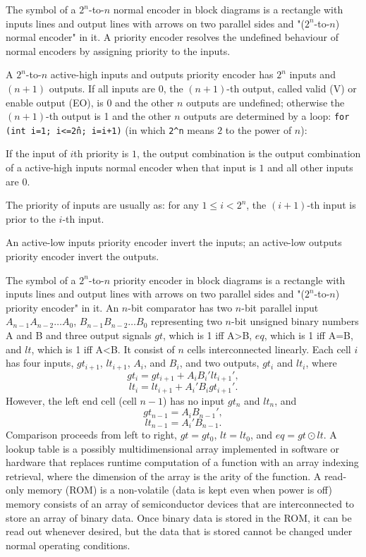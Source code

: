 \documentclass[a4paper,12pt]{report}
\begin{document}
The symbol of a $2^n$-to-$n$ normal encoder in block diagrams is a rectangle with inputs lines and output lines with arrows on two parallel sides and "($2^n$-to-$n$) normal encoder" in it.
A priority encoder resolves the undefined behaviour of normal encoders by assigning priority to the inputs.

A $2^n$-to-$n$ active-high inputs and outputs priority encoder has $2^n$ inputs and $(n+1)$ outputs. If all inputs are 0, the $(n+1)$-th output, called valid (V) or enable output (EO), is 0 and the other $n$ outputs are undefined; otherwise the $(n+1)$-th output is 1 and the other $n$ outputs are determined by a loop: \texttt{for (int i=1; i<=2\^n; i=i+1)} (in which \verb|2^n| means $2$ to the power of $n$):
\bit
\item If the input of $i$th priority is $1$, the output combination is the output combination of a active-high inputs normal encoder when that input is $1$ and all other inputs are $0$.
\eit

The priority of inputs are usually as: for any $1\leq i<2^n$, the $(i+1)$-th input is prior to the $i$-th input.

An active-low inputs priority encoder invert the inputs; an active-low outputs priority encoder invert the outputs.

The symbol of a $2^n$-to-$n$ priority encoder in block diagrams is a rectangle with inputs lines and output lines with arrows on two parallel sides and "($2^n$-to-$n$) priority encoder" in it.
An $n$-bit comparator has two $n$-bit parallel input $A_{n-1}A_{n-2}\ldots A_0$, $B_{n-1}B_{n-2}\ldots B_0$ representing two $n$-bit unsigned binary numbers A and B and three output signals $gt$, which is 1 iff A>B, $eq$, which is 1 iff A=B, and $lt$, which is 1 iff A<B. It consist of $n$ cells interconnected linearly. Each cell $i$ has four inputs, $gt_{i+1}$, $lt_{i+1}$, $A_i$, and  $B_i$, and two outputs, $gt_i$ and $lt_i$, where
\[gt_i=gt_{i+1}+A_iB_i'lt_{i+1}',\]
\[lt_i=lt_{i+1}+A_i'B_igt_{i+1}'.\]
However, the left end cell (cell $n-1$) has no input $gt_n$ and $lt_n$, and
\[gt_{n-1}=A_iB_{n-1}',\]
\[lt_{n-1}=A_i'B_{n-1}.\]
Comparison proceeds from left to right, $gt=gt_0$, $lt=lt_0$, and $eq=gt\odot lt$.
A lookup table is a possibly multidimensional array implemented in software or hardware that replaces runtime computation of a function with an array indexing retrieval, where the dimension of the array is the arity of the function.
A read-only memory (ROM) is a non-volatile (data is kept even when power is off) memory consists of an array of semiconductor devices that are interconnected to store an array of binary data. Once binary data is stored in the ROM, it can be read out whenever desired, but the data that is stored cannot be changed under normal operating conditions.
\end{document}
